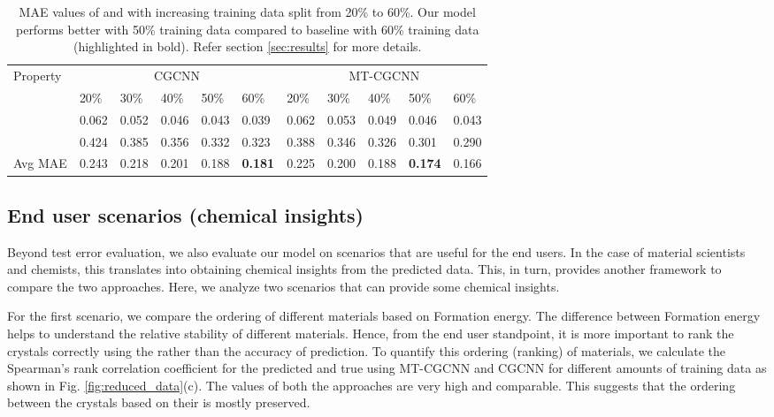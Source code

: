 \documentclass{article}
\newcommand{\method}[1]{MT-CGCNN}
\newcommand{\baseline}[1]{CGCNN}
\newcommand{\proponesym}[1]{}
\newcommand{\proptwosym}[1]{}
\begin{document}
\begin{table}[h]
	\caption{MAE values of \proponesym{} and \proptwosym{} with increasing training data split from 20\% to 60\%. Our model performs better with 50\% training data compared to baseline with 60\% training data (highlighted in bold). Refer section \ref{sec:results} for more details.}
	\label{table:reduced}
	\centering
	\begin{tabular}{lllllllllll}
		\toprule
		\multirow{2}{*}{Property}	&\multicolumn{5}{c}{\baseline{}}		&\multicolumn{5}{c}{\method{}}		\\
									\cmidrule(r){2-6}						\cmidrule(r){7-11}
									&20\%&30\%&40\%&50\%&60\%				&20\%&30\%&40\%&50\%&60\%			\\
		\midrule
		\proponesym{}				&0.062&0.052&0.046&0.043&0.039			&0.062&0.053&0.049&0.046&0.043		\\
		\proptwosym{}				&0.424&0.385&0.356&0.332&0.323			&0.388&0.346&0.326&0.301&0.290		\\
		\midrule
		Avg MAE 					&0.243&0.218&0.201&0.188&\bf{0.181}		&0.225&0.200&0.188&\bf{0.174}&0.166	\\
		\bottomrule
	\end{tabular}
\end{table}

\subsection{End user scenarios (chemical insights)}
\label{sec:Insights}

Beyond test error evaluation, we also evaluate our model on scenarios that are useful for the end users. In the case of material scientists and chemists, this translates into obtaining chemical insights from the predicted data. This, in turn, provides another framework to compare the two approaches. Here, we analyze two scenarios that can provide some chemical insights.

For the first scenario, we compare the ordering of different materials based on Formation energy. The difference between Formation energy helps to understand the relative stability of different materials. Hence, from the end user standpoint, it is more important to rank the crystals correctly using the \proponesym{} rather than the accuracy of prediction. To quantify this ordering (ranking) of materials, we calculate the Spearman's rank correlation coefficient  \cite{myers2003research} for the predicted \proponesym{} and true \proponesym{} using \method{} and \baseline{} for different amounts of training data as shown in Fig. \ref{fig:reduced_data}(c). The  values of both the approaches are very high and comparable. This suggests that the ordering between the crystals based on their \proponesym{} is mostly preserved.
\end{document}
